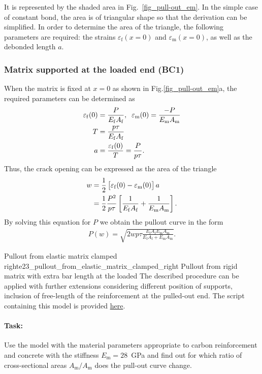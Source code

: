 \documentclass[main.tex]{subfiles}
\begin{document}
It is represented by the shaded area in Fig.~\ref{fig_pull-out_em}. In the simple case of constant bond, the area is of triangular shape so that the derivation can be simplified. In order to determine the area of the triangle, the following parameters are required: the strains $\varepsilon_\mathrm{f}(x=0)$ and $\varepsilon_\mathrm{m}(x=0)$, as well as the debonded length $a$. 

\subsubsection{Matrix supported at the loaded end (BC1)}
When the matrix is fixed at $x=0$ as shown in Fig.\ref{fig_pull-out_em}a,  the required parameters can be determined as
\begin{align}
   \varepsilon_\mathrm{f}(0) &= \frac{P}{E_{\mathrm{f}} A_{\mathrm{f}}},  \;\;
    \varepsilon_\mathrm{m}(0) = \frac{-P}{E_\mathrm{m} A_\mathrm{m}} \\
    T &= \frac{p\tau}{E_{\mathrm{f}} A_{\mathrm{f}}} \\
     a &= \frac{\varepsilon_\mathrm{f}(0)}{T} = \frac{P}{p\tau}.
\end{align}
Thus, the crack opening can be expressed as the area of the triangle
\begin{align}
   w &= \frac{1}{2}\left[\varepsilon_\mathrm{f}(0) - \varepsilon_\mathrm{m}(0)\right]a \nonumber \\
     &= \frac{1}{2}\frac{P^2}{p\tau} \left[\frac{1}{E_{\mathrm{f}} A_{\mathrm{f}}} + \frac{1}{E_\mathrm{m} A_\mathrm{m}}\right].
\end{align}
By solving this equation for $P$ we obtain the pullout curve in the form
\begin{align}
   P(w) = \sqrt{2wp\tau \frac{E_\mathrm{f}A_\mathrm{f}E_\mathrm{m}A_\mathrm{m}}{E_\mathrm{f}A_\mathrm{f}+E_\mathrm{m}A_\mathrm{m}}}.
\end{align}

\begin{bmcsex}{Pullout from elastic matrix clamped right}{e23_pullout_from_elastic_matrix_clamped_right}
Pullout from rigid matrix with extra bar length at the loaded 
The described procedure can be applied with further extensions considering different position of supports, inclusion of free-length of the reinforcement at the pulled-out end. The script containing this model is provided 
\href{https://moodle.rwth-aachen.de/pluginfile.php/261132/mod_folder/content/0/example_2.3_pull-out_from_elastic_matrix_supported_at_loaded_end.ipynb?forcedownload=1}{here}.

\paragraph{Task:} Use the model with the material parameters appropriate to carbon reinforcement and concrete with the stiffness $E_\mathrm{m} = 28$~GPa and find out for which ratio of cross-sectional areas $A_\mathrm{m}/A_\mathrm{m}$ 
does the pull-out curve change. 

\end{bmcsex}
\end{document}
